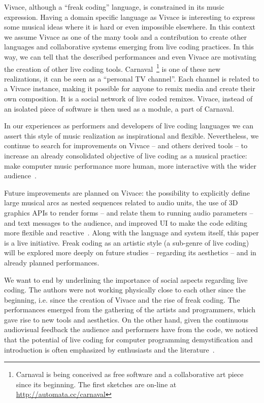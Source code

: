 \documentclass[12pt,times,twocolumn]{article}
\begin{document}
Vivace, although a ``freak coding'' language, is constrained in its
music expression. Having a domain specific language as Vivace is
interesting to express some musical ideas where it is hard or
even impossible elsewhere. In this context we assume Vivace as
one of the many tools and a contribution to create other languages and
collaborative systems emerging from live coding practices. In this
way, we can tell that the described performances and even Vivace are
motivating the creation of other live coding
tools. Carnaval~\footnote{Carnaval is being conceived as free software
  and a collaborative art piece since its beginning. The first
  sketches are on-line at \url{http://automata.cc/carnaval}} is one of
these new realizations, it can be seen as a ``personal TV
channel''. Each channel is related to a Vivace instance, making it
possible for anyone to remix media and create their own
composition. It is a social network of live coded remixes. Vivace,
instead of an isolated piece of software is then used as a module,
a part of Carnaval.

In our experiences as performers and developers of live coding
languages we can assert this style of music realization as
inspirational and flexible. Nevertheless, we continue to search for
improvements on Vivace -- and others derived tools -- to increase an
already consolidated objective of live coding as a musical practice:
make computer music performance more human, more interactive with the
wider audience~\cite{collins2011live}.

Future improvements are planned on Vivace: the possibility to
explicitly define large musical arcs as nested sequences related to
audio units, the use of 3D graphics APIs to render forms -- and relate them to running audio parameters -- 
and text messages to the audience, and improved UI to make the code editing more
flexible and reactive~\cite{brett}. Along with the language and
system itself, this paper is a live initiative. Freak coding as an
artistic style (a sub-genre of live coding) will be explored more deeply on future studies --
regarding its aesthetics -- and in already planned performances.

We want to end by underlining the importance of social aspects
regarding live coding. The authors
were not working physically close to each other since the beginning,
i.e. since the creation of
Vivace and the rise of freak coding. The performances emerged from
the gathering of the artists and programmers,
which gave rise to new tools and
aesthetics.
On the other hand,
given the continuous audiovisual feedback the audience and performers
have from the code,
we noticed that the potential of live coding for
computer programming demystification and introduction
is often emphasized by enthusiasts and the literature~\cite{eff}.



% 

\end{document}
